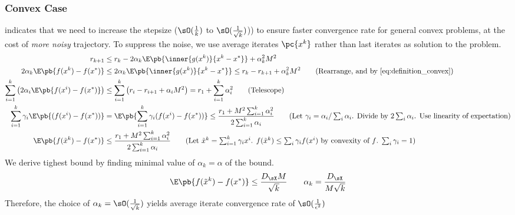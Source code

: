 \documentclass[../summary.tex]{subfiles}
\begin{document}
\subsubsection{Convex Case}

\cite{nemirovskiRobustStochasticApproximation2009} indicates that we need to increase the stepsize ($\sO(\frac{1}{k})$ to $\sO(\frac{1}{\sqrt{k}})$)) to ensure faster convergence rate for general convex problems, at the cost of \textit{more noisy} trajectory. To suppress the noise, we use average iterates $\pc{x^k}$ rather than last iterates as solution to the problem.
\begin{align*}
    r_{k+1}
        &\leq r_k - 2\alpha_k \E\pb{\inner{g(x^k)}{x^k-x^*}} + \alpha_k^2 M^2\\
    2\alpha_k \E\pb{ f(x^k) - f(x^*) }
        &\leq 2\alpha_k \E\pb{\inner{g(x^k)}{x^k - x^*}}
        \leq r_k - r_{k+1} + \alpha_k^2 M^2
            \tag{Rearrange, and by \ref{eq:definition_convex}} \\
    \sum_{i=1}^k \left( 2\alpha_i \E\pb{f(x^i) - f(x^*)} \right)
        &\leq \sum_{i=1}^k \left( r_i - r_{i+1} + \alpha_i M^2\right)
        = r_1 + \sum_{i=1}^k \alpha_i^2 
            \tag{Telescope} \\ 
    \sum_{i=1}^k \gamma_i \E\pb{(f(x^i) - f(x^*))}
        &= \E\pb{\sum_{i=1}^k \gamma_i (f(x^i) - f(x^*))}
        \leq \frac{r_1 + M^2 \sum_{i=1}^k \alpha_i^2}{2\sum_{i=1}^k \alpha_i}
            \tag{Let $\gamma_i = \alpha_i/\sum_i\alpha_i$. Divide by $2\sum_i\alpha_i$. Use linearity of expectation} \\
    \E\pb{f(\tilde{x}^k) - f(x^*)}
        &\leq \frac{r_1 + M^2 \sum_{i=1}^k \alpha_i^2}{2\sum_{i=1}^k \alpha_i}
            \tag{Let $\tilde{x}^k = \sum_{i=1}^k \gamma_i x^i$. $f(\tilde{x}^k)\leq \sum_i \gamma_i f(x^i)$ by convexity of $f$. $\sum_i\gamma_i = 1$}
\end{align*}
We derive tighest bound by finding minimal value of $\alpha_k = \alpha$ of the bound.
\[
    \E\pb{f(\tilde{x}^k) - f(x^*)}
        \leq \frac{D_{\sX}M}{\sqrt{k}}
        \quad\quad
        \alpha_k = \frac{D_{\sX}}{M\sqrt{k}}
\]
Therefore, the choice of $\alpha_k = \sO(\frac{1}{\sqrt{k}})$ yields average iterate convergence rate of $\sO(\frac{1}{\epsilon^2})$
\end{document}
